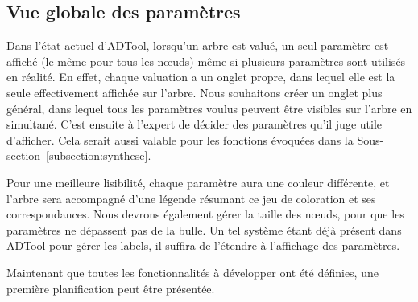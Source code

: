    \subsection{Vue globale des paramètres}
        Dans l'état actuel d'ADTool, lorsqu'un arbre est valué, un seul paramètre est affiché (le même pour tous les nœuds) même si plusieurs paramètres sont utilisés en réalité. En effet, chaque valuation a un onglet propre, dans lequel elle est la seule effectivement affichée sur l'arbre. Nous souhaitons créer un onglet plus général, dans lequel tous les paramètres voulus peuvent être visibles sur l'arbre en simultané. C'est ensuite à l'expert de décider des paramètres qu'il juge utile d'afficher. Cela serait aussi valable pour les fonctions évoquées dans la {\sc Sous-section}~\ref{subsection:synthese}.
    
        Pour une meilleure lisibilité, chaque paramètre aura une couleur différente, et l'arbre sera accompagné d'une légende résumant ce jeu de coloration et ses correspondances. Nous devrons également gérer la taille des nœuds, pour que les paramètres ne dépassent pas de la bulle. Un tel système étant déjà présent dans ADTool pour gérer les labels, il suffira de l'étendre à l'affichage des paramètres.

        Maintenant que toutes les fonctionnalités à développer ont été définies, une première planification peut être présentée. 